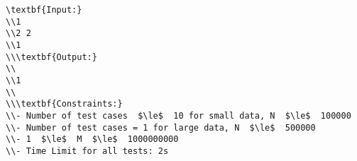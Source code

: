 \begin{verbatim}
\textbf{Input:}
\\1
\\2 2
\\1
\\\textbf{Output:}
\\
\\1
\\
\\\textbf{Constraints:}
\\- Number of test cases  $\le$  10 for small data, N  $\le$  100000
\\- Number of test cases = 1 for large data, N  $\le$  500000
\\- 1  $\le$  M  $\le$  1000000000
\\- Time Limit for all tests: 2s\end{verbatim}
